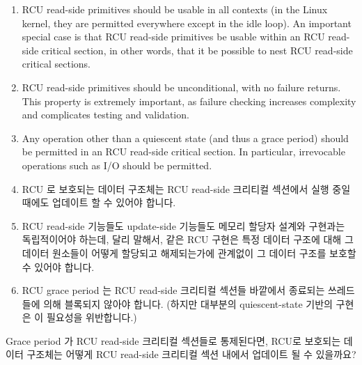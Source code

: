 \begin{enumerate}
\item	RCU read-side primitives should be usable in all contexts
	(in the Linux kernel, they are permitted everywhere except in
	the idle loop).
	An important special case is that RCU read-side primitives be
	usable within an RCU read-side critical section, in other words,
	that it be possible to nest RCU read-side critical sections.
\item	RCU read-side primitives should be unconditional, with no
	failure returns.
	This property is extremely important, as failure checking
	increases complexity and complicates testing and validation.
\item	Any operation other than a quiescent state (and thus a grace
	period) should be permitted in an RCU read-side critical section.
	In particular, irrevocable operations such as I/O should be
	permitted.
\fi
\item	RCU 로 보호되는 데이터 구조체는 RCU read-side 크리티컬 섹션에서 실행
	중일 때에도 업데이트 할 수 있어야 합니다.
\item	RCU read-side 기능들도 update-side 기능들도 메모리 할당자 설계와
	구현과는 독립적이어야 하는데, 달리 말해서, 같은 RCU 구현은 특정 데이터
	구조에 대해 그 데이터 원소들이 어떻게 할당되고 해제되는가에 관계없이 그
	데이터 구조를 보호할 수 있어야 합니다.
\item	RCU grace period 는 RCU read-side 크리티컬 섹션들 바깥에서 종료되는
	쓰레드들에 의해 블록되지 않아야 합니다.
	(하지만 대부분의 quiescent-state 기반의 구현은 이 필요성을 위반합니다.)
\iffalse

\item	It should be possible to update an RCU-protected data structure
	while executing within an RCU read-side critical section.
\item	Both RCU read-side and update-side primitives should be independent
	of memory allocator design and implementation, in other words,
	the same RCU implementation should be able to protect a given
	data structure regardless of how the data elements are allocated
	and freed.
\item	RCU grace periods should not be blocked by threads that
	halt outside of RCU read-side critical sections.
	(But note that most quiescent-state-based implementations
	violate this desideratum.)
\fi
\end{enumerate}

\QuickQuiz{}
	Grace period 가 RCU read-side 크리티컬 섹션들로 통제된다면, RCU로
	보호되는 데이터 구조체는 어떻게 RCU read-side 크리티컬 섹션 내에서
	업데이트 될 수 있을까요?
	\iffalse

